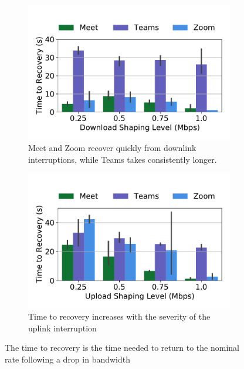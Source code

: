 \begin{figure}[ht]
\begin{subfigure}[t]{.5\textwidth}
  \centering
    \includegraphics[width=1\textwidth,keepaspectratio]{../figures/interrupt/TTR-dnld.pdf}
    \captionsetup{width=.9\linewidth}
    \caption{Meet and Zoom recover quickly from downlink interruptions, while Teams takes consistently longer.}
    \label{fig:TTR_dnld}
\end{subfigure}
\begin{subfigure}[t]{.5\textwidth}
  \centering
    \includegraphics[width=1\textwidth,keepaspectratio]{../figures/interrupt/TTR-upld.pdf}
    \captionsetup{width=.9\linewidth}
    \caption{Time to recovery increases with the severity of the uplink interruption}
    \label{fig:TTR_upld}
\end{subfigure}
\caption{The time to recovery is the time needed to return to the nominal rate following a drop in bandwidth}
\label{fig:TTR}
\end{figure}



